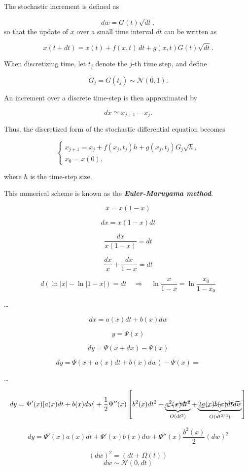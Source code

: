 The stochastic increment is defined as

$$
dw = G(t)\sqrt{dt},
$$
so that the update of $x$ over a small time interval $dt$ can be written as

$$
x(t+dt) = x(t) + f(x,t)\,dt + g(x,t)G(t)\sqrt{dt}.
$$

When discretizing time, let $t_j$ denote the $j$-th time step, and define

$$
G_j = G(t_j) \sim \mathcal{N}(0,1).
$$

An increment over a discrete time-step is then approximated by

$$
dx \simeq x_{j+1} - x_j.
$$

Thus, the discretized form of the stochastic differential equation becomes

$$
\begin{cases}
    x_{j+1} = x_j + f(x_j,t_j)h + g(x_j,t_j)G_j\sqrt{h},\\[1mm]
    x_0 = x(0),
\end{cases}
$$

where $h$ is the time-step size.

This numerical scheme is known as the \textit{\textbf{Euler-Maruyama method}}.

\newpage

$$
\dot x = x(1-x)
$$

$$
dx = x(1-x)dt
$$

$$
\dfrac {dx}{x(1-x)} = dt
$$

$$
\dfrac {dx}{x} + \dfrac {dx}{1-x} = dt
$$

$$
d(\ln|x| - \ln|1-x|) = dt
\quad \Rightarrow \quad
\ln \dfrac x{1-x} = \ln \dfrac {x_0}{1-x_0}
$$

\dots

$$
dx = a(x) dt + b(x) dw
$$

$$
y = \Psi(x)
$$

$$
dy = \Psi(x + dx) - \Psi(x)
$$

$$
dy = \Psi(x + a(x)dt + b(x)dw) - \Psi(x) = 
$$

\dots

$$
dy = \Psi'(x)[a(x)dt + b(x)dw] + \dfrac 12 \Psi''(x)
\left[
    b^2(x)dt^2 +
    \underbrace{\cancel{a^2(x)dt^2}}_{O(dt^2)} +
    \underbrace{\cancel{2a(x)b(x)dt dw}}_{O(dt^{2/3})}
\right]
$$

$$
dy = \Psi'(x)a(x)dt + \Psi'(x)b(x)dw + \Psi''(x) \dfrac {b^2(x)}2 (dw)^2
$$

$$
(dw)^2 = (dt + \Omega(t))
$$
$$
dw \sim \mathcal{N}(0,dt)
$$

